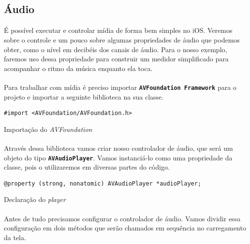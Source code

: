 \documentclass[a4paper,12pt,brazil,doubleside]{book}
\begin{document}
\begin{singlespace}
\section{Áudio}

\paragraph{}É possível executar e controlar mídia de forma bem simples no iOS. Veremos sobre o controle e um pouco sobre algumas propriedades de áudio que podemos obter, como o nível em decibéis dos canais de áudio. Para o nosso exemplo, faremos uso dessa propriedade para construir um medidor simplificado para acompanhar o ritmo da música enquanto ela toca.
\paragraph{}Para trabalhar com mídia é preciso importar \texttt{\textbf{AVFoundation Framework}} para o projeto e importar a seguinte biblioteca na sua classe.

\begin{listing}[H]
\begin{verbatim}
#import <AVFoundation/AVFoundation.h>
\end{verbatim}
\caption{Importação do \emph{AVFoundation}}
\end{listing}

\paragraph{}Através dessa biblioteca vamos criar nosso controlador de áudio, que será um objeto do tipo \texttt{\textbf{AVAudioPlayer}}. Vamos instanciá-lo como uma propriedade da classe, pois o utilizaremos em diversas partes do código.

\begin{listing}[H]
\begin{verbatim}
@property (strong, nonatomic) AVAudioPlayer *audioPlayer;
\end{verbatim}
\caption{Declaração do \emph{player}}
\end{listing}

\paragraph{}Antes de tudo precisamos configurar o controlador de áudio. Vamos dividir essa configuração em dois métodos que serão chamados em sequência no carregamento da tela.

\end{singlespace}
\end{document}

